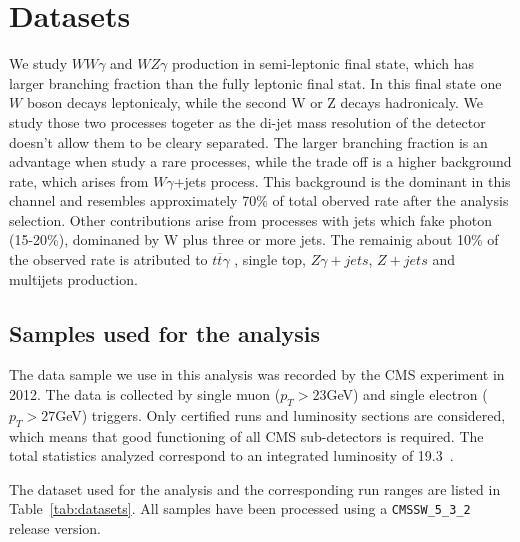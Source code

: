 \section{Datasets}
\label{sec:technicalities}

We study $WW\gamma$ and $WZ\gamma$ production in semi-leptonic final state, which has larger branching fraction than the fully leptonic final stat. 
In this final state one $W$ boson decays leptonicaly, while the second W or Z decays hadronicaly. We study those two processes togeter as the di-jet mass resolution of the 
detector doesn't allow them to be cleary separated.  
The larger branching fraction is an advantage when study a rare processes, while the trade off is a higher background rate, which arises from $W\gamma$+jets process. 
This background is the dominant in this channel and resembles approximately 70\% of total oberved rate after the analysis selection. Other contributions arise from processes 
with jets which fake photon (15-20\%), dominaned by W plus three or more jets. The remainig about 10\% of the observed rate is atributed to $t\overline{t}\gamma$ , single 
top, $Z\gamma+jets$, $Z+jets$ and multijets production.  

\subsection{Samples used for the analysis}

The data sample we use in this analysis was recorded by the CMS experiment 
in 2012. The data is collected by single muon ($p_T>23$GeV) and single electron ($p_T>27$GeV) triggers. 
Only certified runs and luminosity sections are considered, which 
means that good functioning of all CMS sub-detectors is required. The total 
statistics analyzed correspond to an integrated luminosity of 19.3~\fbinv.

The dataset used for the analysis and the corresponding run ranges are 
listed in Table~\ref{tab:datasets}. All samples have been processed using a 
\texttt{CMSSW\_5\_3\_2} release version.

